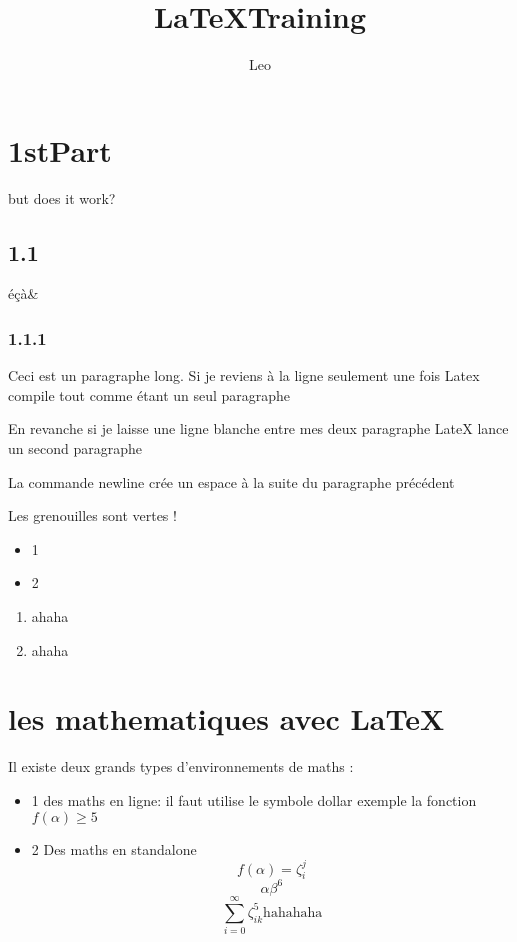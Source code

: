 \documentclass[a4paper, 10pt]{article}
\title{\LaTeX  Training}
\author{Leo}
\begin{document}
\maketitle
\tableofcontents
\newpage
\begin{multicols}{2}

\section{1stPart}
but does it work?

\subsection{1.1}
éçà\& %
\subsubsection{1.1.1}


Ceci est un paragraphe long. 
Si je reviens à la  ligne seulement une fois Latex compile tout comme étant un seul paragraphe

En revanche si je laisse une ligne blanche entre mes deux paragraphe LateX lance un second paragraphe
\newline

La commande newline crée un espace à la suite du paragraphe précédent

Les grenouilles sont vertes !


\begin{itemize}
\item 1
\newline
\item 2 
\end{itemize}


\begin{enumerate}
\item ahaha
\item ahaha
\end{enumerate}


\section{les mathematiques avec \LaTeX}

Il existe deux grands types d'environnements de maths :
\begin{itemize}
\item 1
des maths en ligne:  il faut utilise le symbole dollar
exemple la fonction $f(\alpha) \geq 5$
\item 2
Des maths en standalone
$$
f(\alpha)=\zeta_i^j
$$
$$
{\alpha \beta }^6
$$
$$
\sum_{i=0}^\infty \zeta_{ik}^5
\mbox{hahahaha} %
$$


\end{itemize}
\end{multicols}
\end{document}
